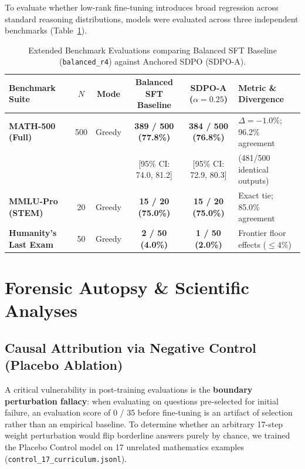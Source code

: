 \documentclass[11pt,a4paper]{article}
\begin{document}
To evaluate whether low-rank fine-tuning introduces broad regression across standard reasoning distributions, models were evaluated across three independent benchmarks (Table~\ref{tab:extended}).

\begin{table}[htbp]
\centering
\caption{Extended Benchmark Evaluations comparing Balanced SFT Baseline (\texttt{balanced\_r4}) against Anchored SDPO (SDPO-A).}
\label{tab:extended}
\small
\begin{tabular}{@{}lccccl@{}}
\toprule
\textbf{Benchmark Suite} & $N$ & \textbf{Mode} & \textbf{Balanced SFT Baseline} & \textbf{SDPO-A ($\alpha=0.25$)} & \textbf{Metric \& Divergence} \\
\midrule
\textbf{MATH-500 (Full)}~\cite{hendrycks2021math} & 500 & Greedy & \textbf{389 / 500 (77.8\%)} & \textbf{384 / 500 (76.8\%)} & $\Delta = -1.0\%$; 96.2\% agreement \\
 & & & {\scriptsize [95\% CI: 74.0, 81.2]} & {\scriptsize [95\% CI: 72.9, 80.3]} & (481/500 identical outputs) \\
\addlinespace
\textbf{MMLU-Pro (STEM)} & 20 & Greedy & \textbf{15 / 20 (75.0\%)} & \textbf{15 / 20 (75.0\%)} & Exact tie; 85.0\% agreement \\
\addlinespace
\textbf{Humanity's Last Exam}~\cite{phan2025hle} & 50 & Greedy & \textbf{2 / 50 (4.0\%)} & \textbf{1 / 50 (2.0\%)} & Frontier floor effects ($\le 4\%$) \\
\bottomrule
\end{tabular}
\end{table}

\section{Forensic Autopsy \& Scientific Analyses}

\subsection{Causal Attribution via Negative Control (Placebo Ablation)}

A critical vulnerability in post-training evaluations is the \textbf{boundary perturbation fallacy}: when evaluating on questions pre-selected for initial failure, an evaluation score of 0 / 35 before fine-tuning is an artifact of selection rather than an empirical baseline. To determine whether an arbitrary 17-step weight perturbation would flip borderline answers purely by chance, we trained the Placebo Control model on 17 unrelated mathematics examples (\texttt{control\_17\_curriculum.jsonl}).
\end{document}
